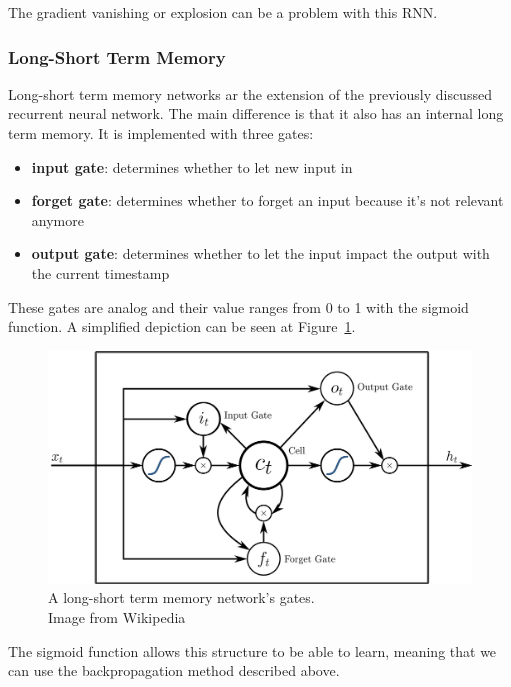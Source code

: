 The gradient vanishing or explosion can be a problem with this RNN.
\subsubsection{Long-Short Term Memory}
Long-short term memory networks ar the extension of the previously discussed recurrent neural network. The main difference is that it also has an internal long term memory. It is implemented with three gates:
\begin{itemize}
	\item \textbf{input gate}: determines whether to let new input in
	\item \textbf{forget gate}: determines whether to forget an input because it's not relevant anymore
	\item \textbf{output gate}: determines whether to let the input impact the output with the current timestamp
\end{itemize}
These gates are analog and their value ranges from 0 to 1 with the sigmoid function. A simplified depiction can be seen at Figure~\ref{fig:lstm}.
\begin{figure}[!htb]
	\centering
	\includegraphics[scale=0.2]{lstm.jpg}
	\caption{A long-short term memory network's gates.\\Image from Wikipedia}
	\label{fig:lstm}
\end{figure}

The sigmoid function allows this structure to be able to learn, meaning that we can use the backpropagation method described above.

